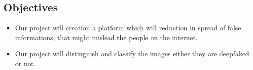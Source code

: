 \subsection{Objectives}
\justify
\begin{itemize}
    \item Our project will creation a platform which will reduction in spread of false informations, that might mislead the people on the internet.
    \item Our project will distinguish and classify the images either they are deepfaked or not.
\end{itemize}

